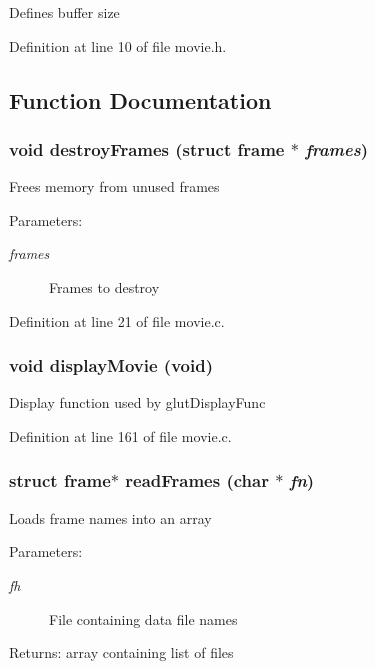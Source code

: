Defines buffer size 

Definition at line 10 of file movie.h.

\subsection{Function Documentation}
\subsubsection{\setlength{\rightskip}{0pt plus 5cm}void destroy\-Frames (struct {\bf frame} $\ast$ {\em frames})}\label{movie_8h_a1}


Frees memory from unused frames

\begin{Desc}
\item[Parameters:]
\begin{description}
\item[{\em frames}]Frames to destroy \end{description}
\end{Desc}


Definition at line 21 of file movie.c.
\subsubsection{\setlength{\rightskip}{0pt plus 5cm}void display\-Movie (void)}\label{movie_8h_a4}


Display function used by glut\-Display\-Func 

Definition at line 161 of file movie.c.
\subsubsection{\setlength{\rightskip}{0pt plus 5cm}struct {\bf frame}$\ast$ read\-Frames (char $\ast$ {\em fn})}\label{movie_8h_a2}


Loads frame names into an array

\begin{Desc}
\item[Parameters:]
\begin{description}
\item[{\em fh}]File containing data file names \end{description}
\end{Desc}
\begin{Desc}
\item[Returns:]array containing list of files \end{Desc}


